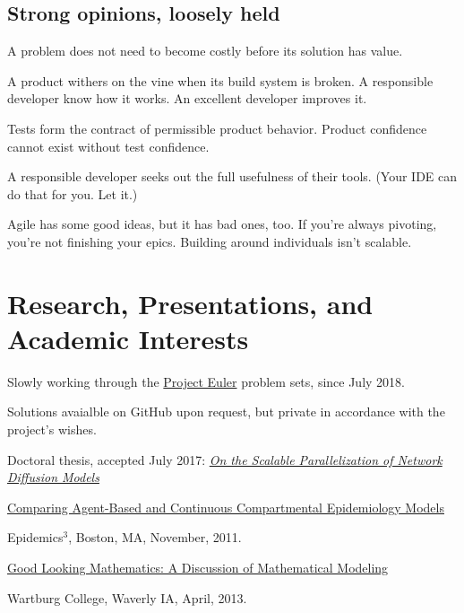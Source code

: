 \documentclass[10pt,letterpaper]{article}
\renewenvironment{itemize}{
  \begin{list}{}{
    \setlength{\leftmargin}{1.5em}
    \setlength{\itemsep}{0.25em}
    \setlength{\parskip}{0pt}
    \setlength{\parsep}{0.25em}
  }
}{
  \end{list}
}
\begin{document}
\subsection*{Strong opinions, loosely held}
\begin{itemize}
  \item A problem does not need to become costly before its solution has value.
  \item A product withers on the vine when its build system is broken.  A responsible developer know how it works.  An excellent developer improves it.
  \item Tests form the contract of permissible product behavior.  Product confidence cannot exist without test confidence.
  \item A responsible developer seeks out the full usefulness of their tools.  (Your IDE can do that for you.  Let it.)
  \item Agile has some good ideas, but it has bad ones, too.  If you're always pivoting, you're not finishing your epics.  Building around individuals isn't scalable.
\end{itemize}

\section*{Research, Presentations, and Academic Interests}
\begin{itemize}
  \item Slowly working through the \href{https://projecteuler.net/}{Project Euler} problem sets, since July 2018.
\begin{itemize}
  \item Solutions avaialble on GitHub upon request, but private in accordance with the project's wishes.
\end{itemize}
\item
  Doctoral thesis, accepted July 2017:
  \href{https://ir.uiowa.edu/etd/5831/}
    {\em On the Scalable Parallelization of Network Diffusion Models}
\item
  \href{http://www.math.uiowa.edu/~prhomber/Rhomberg-E3-ModelComparison.pdf}
    {Comparing Agent-Based and Continuous Compartmental Epidemiology Models}
  \begin{itemize}
  \item Epidemics$^3$,
    Boston, MA, November, 2011.
  \end{itemize}
\item
  \href{http://www.math.uiowa.edu/~prhomber/beamer.pdf}
    {Good Looking Mathematics: A Discussion of Mathematical Modeling}
  \begin{itemize}
  \item  Wartburg College, Waverly IA, April, 2013.
  \end{itemize}
\end{itemize}
\end{document}
